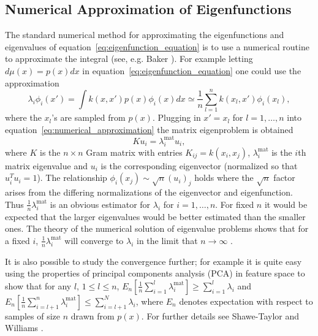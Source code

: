 \documentclass[11pt]{book}
\begin{document}
\subsection{Numerical Approximation of Eigenfunctions}
\label{sec:numerical_eigen}

The standard numerical method for approximating the eigenfunctions and eigenvalues of equation~\eqref{eq:eigenfunction_equation} is to use a numerical routine to approximate the integral (see, e.g. Baker \cite{baker1977}). For example letting $d\mu(x) = p(x)dx$ in equation~\eqref{eq:eigenfunction_equation} one could use the approximation
\begin{equation}
\label{eq:numerical_approximation}
\lambda_i \phi_i(x') = \int k(x, x') p(x) \phi_i(x) dx \simeq \frac{1}{n} \sum_{l=1}^n k(x_l, x') \phi_i(x_l),
\end{equation}
where the $x_l$'s are sampled from $p(x)$. Plugging in $x' = x_l$ for $l = 1, \ldots, n$ into equation~\eqref{eq:numerical_approximation} the matrix eigenproblem is obtained
\begin{equation}
\label{eq:matrix_eigenproblem}
K u_i = \lambda_i^{\text{mat}} u_i,
\end{equation}
where $K$ is the $n \times n$ Gram matrix with entries $K_{ij} = k(x_i, x_j)$, $\lambda_i^{\text{mat}}$ is the $i$th matrix eigenvalue and $u_i$ is the corresponding eigenvector (normalized so that $u_i^T u_i = 1$). The relationship $\phi_i(x_j) \sim \sqrt{n}(u_i)_j$ holds where the $\sqrt{n}$ factor arises from the differing normalizations of the eigenvector and eigenfunction. Thus $\frac{1}{n}\lambda_i^{\text{mat}}$ is an obvious estimator for $\lambda_i$ for $i = 1, \ldots, n$. For fixed $n$ it would be expected that the larger eigenvalues would be better estimated than the smaller ones. The theory of the numerical solution of eigenvalue problems shows that for a fixed $i$, $\frac{1}{n}\lambda_i^{\text{mat}}$ will converge to $\lambda_i$ in the limit that $n \to \infty$ \cite{baker1977}.

It is also possible to study the convergence further; for example it is quite easy using the properties of principal components analysis (PCA) in feature space to show that for any $l$, $1 \leq l \leq n$, $E_n\left[\frac{1}{n}\sum_{i=1}^l \lambda_i^{\text{mat}}\right] \geq \sum_{i=1}^l \lambda_i$ and $E_n\left[\frac{1}{n}\sum_{i=l+1}^n \lambda_i^{\text{mat}}\right] \leq \sum_{i=l+1}^N \lambda_i$, where $E_n$ denotes expectation with respect to samples of size $n$ drawn from $p(x)$. For further details see Shawe-Taylor and Williams \cite{shawe2003}.
\end{document}

